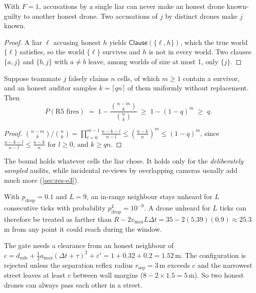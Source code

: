 \begin{corollary}
\label{cor:framing}
With $F=1$, accusations by a single liar can never make an honest drone known-guilty to another honest drone. Two
accusations of $j$ by distinct drones make $j$ known.
\end{corollary}
\begin{proof}
A liar $\ell$ accusing honest $h$ yields $\mathsf{Clause}(\{\ell,h\})$, which the true world $\{\ell\}$ satisfies, so the
world $\{\ell\}$ survives and $h$ is not in every world. Two clauses $\{a,j\}$ and $\{b,j\}$ with $a\neq b$ leave, among
worlds of size at most 1, only $\{j\}$.
\end{proof}

\begin{proposition}
\label{prop:audit}
Suppose teammate $j$ falsely claims $n$ cells, of which $m\ge1$ contain a survivor, and an honest auditor samples
$k=\lceil qn\rceil$ of them uniformly without replacement. Then
\begin{equation}
    P(\text{R5 fires}) \;=\; 1-\frac{\binom{n-m}{k}}{\binom{n}{k}} \;\ge\; 1-(1-q)^m \;\ge\; q .
\end{equation}
\end{proposition}
\begin{proof}
$\binom{n-m}{k}/\binom{n}{k}=\prod_{l=0}^{m-1}\frac{n-k-l}{n-l}\le\left(\frac{n-k}{n}\right)^m\le(1-q)^m$, since
$\frac{n-k-l}{n-l}\le\frac{n-k}{n}$ for $l\ge0$, and $k\ge qn$.
\end{proof}
The bound holds whatever cells the liar chose. It holds only for the \emph{deliberately sampled} audits, while incidental
re-views by overlapping cameras usually add much more (\autoref{sec:res-e3}).

\begin{proposition}
\label{prop:silence}
With $p_{\mathrm{drop}}=0.1$ and $L=9$, an in-range neighbour stays unheard for $L$ consecutive ticks with probability
$p_{\mathrm{drop}}^{L}=10^{-9}$. A drone unheard for $L$ ticks can therefore be treated as farther than
$R-2v_{\max}L\Delta t = 35-2(5.39)(0.9)\approx 25.3$\,m from any point it could reach during the window.
\end{proposition}

\begin{proposition}
\label{prop:clearance}
The gate needs a clearance from an honest neighbour of
$c=d_{\mathrm{safe}}+\tfrac12 a_{\max}(\Delta t+\tau)^2+\varepsilon' = 1+0.32+0.2 = 1.52$\,m. The configuration is
rejected unless the separation reflex radius $r_{\mathrm{sep}}=3$\,m exceeds $c$ and the narrowest street leaves at
least $c$ between wall margins ($8-2\times1.5=5$\,m). So two honest drones can always pass each other in a street.
\end{proposition}

